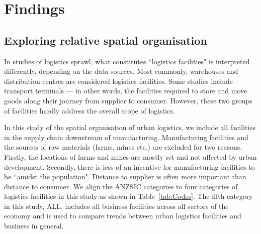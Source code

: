 \documentclass[3p, a4paper, authoryear, 11pt, fleqn, review]{elsarticle}
\newcommand{\nmt}[1]{{\color{ForestGreen}{~(nmt: #1)}}}
\begin{document}


\section{Findings}
\label{sec:Findings}
\nmt{NADIA CONTINUE HERE}
\subsection{Exploring relative spatial organisation}
In studies of logistics sprawl, what constitutes ``logistics facilities" is interpreted differently, depending on the data sources. Most commonly, warehouses and distribution centres are considered logistics facilities. Some studies include transport terminals --- in other words, the facilities required to store and move goods along their journey from supplier to consumer. However, these two groups of facilities hardly address the overall scope of logistics. 

In this study of the spatial organisation of urban logistics, we include all facilities in the supply chain downstream of manufacturing. Manufacturing facilities and the sources of raw materials (farms, mines etc.) are excluded for two reasons. Firstly, the locations of farms and mines are mostly set and not affected by urban development. Secondly, there is less of an incentive for manufacturing facilities to be ``amidst the population". Distance to supplier is often more important than distance to consumer. We align the \ac{ANZSIC} categories to four categories of logistics facilities in this study as shown in Table~\ref{tab:Codes}. The fifth category in this study, ALL, includes all business facilities across all sectors of the economy and is used to compare trends between urban logistics facilities and business in general. 
\end{document}
